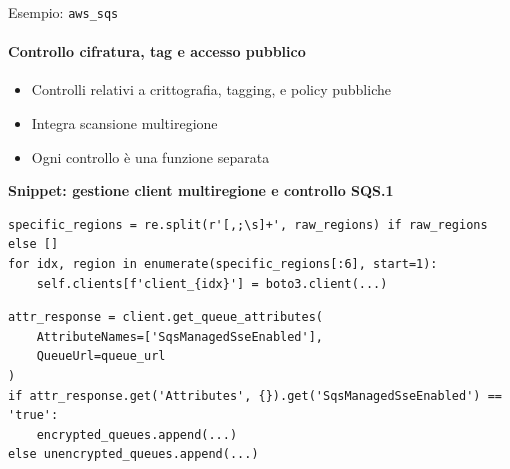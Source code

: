 \documentclass{beamer}
\begin{document}
\begin{frame}[fragile]{Esempio: \texttt{aws\_sqs}}
\framesubtitle{Controllo cifratura, tag e accesso pubblico}
\begin{itemize}
    \item<1-> Controlli relativi a crittografia, tagging, e policy pubbliche
    \item<2-> Integra scansione multiregione
    \item<3-> Ogni controllo è una funzione separata
\end{itemize}

\textbf{Snippet: gestione client multiregione e controllo SQS.1}
\begin{lstlisting}[style=statalepython, basicstyle=\scriptsize\ttfamily]
specific_regions = re.split(r'[,;\s]+', raw_regions) if raw_regions else []
for idx, region in enumerate(specific_regions[:6], start=1):
    self.clients[f'client_{idx}'] = boto3.client(...)
\end{lstlisting}

\begin{lstlisting}[style=statalepython, basicstyle=\scriptsize\ttfamily]
attr_response = client.get_queue_attributes(
    AttributeNames=['SqsManagedSseEnabled'],
    QueueUrl=queue_url
)
if attr_response.get('Attributes', {}).get('SqsManagedSseEnabled') == 'true':
    encrypted_queues.append(...)
else unencrypted_queues.append(...)
\end{lstlisting}

\end{frame}
\end{document}
